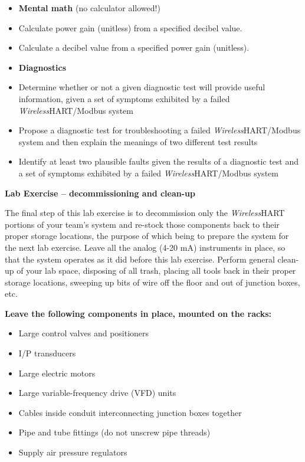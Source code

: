 \filbreak

\begin{itemize}
\item{} {\bf Mental math} (no calculator allowed!)
\item{} Calculate power gain (unitless) from a specified decibel value.
\item{} Calculate a decibel value from a specified power gain (unitless).
\end{itemize}

\filbreak

\begin{itemize}
\item{} {\bf Diagnostics}
\item{} Determine whether or not a given diagnostic test will provide useful information, given a set of symptoms exhibited by a failed {\sl Wireless}HART/Modbus system
\item{} Propose a diagnostic test for troubleshooting a failed {\sl Wireless}HART/Modbus system and then explain the meanings of two different test results
\item{} Identify at least two plausible faults given the results of a diagnostic test and a set of symptoms exhibited by a failed {\sl Wireless}HART/Modbus system
\end{itemize}









\vfil \eject

\noindent
{\bf Lab Exercise -- decommissioning and clean-up}

\vskip 5pt

The final step of this lab exercise is to decommission only the {\sl Wireless}HART portions of your team's system and re-stock those components back to their proper storage locations, the purpose of which being to prepare the system for the next lab exercise.  Leave all the analog (4-20 mA) instruments in place, so that the system operates as it did before this lab exercise.  Perform general clean-up of your lab space, disposing of all trash, placing all tools back in their proper storage locations, sweeping up bits of wire off the floor and out of junction boxes, etc.

\vskip 10pt

\indent
{\bf Leave the following components in place, mounted on the racks:}

\begin{itemize}
\item{} Large control valves and positioners
\item{} I/P transducers
\item{} Large electric motors
\item{} Large variable-frequency drive (VFD) units
\item{} Cables inside conduit interconnecting junction boxes together
\item{} Pipe and tube fittings (do not unscrew pipe threads)
\item{} Supply air pressure regulators
\end{itemize}

